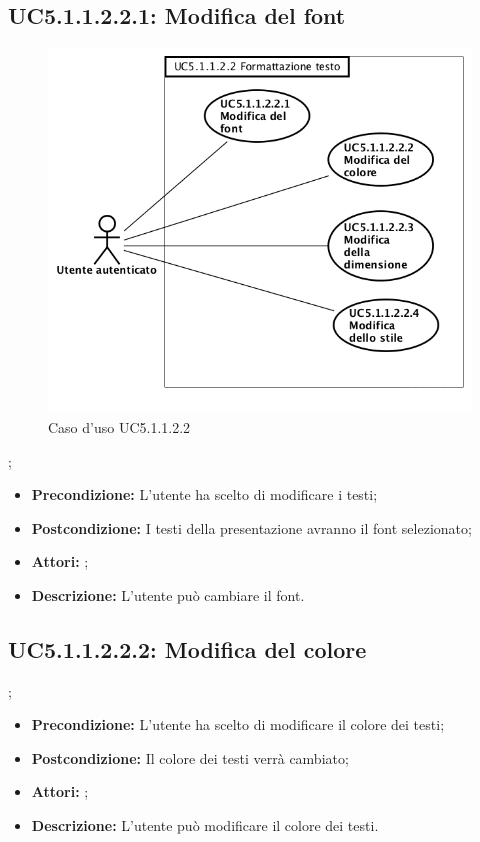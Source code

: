 \subsection{ UC5.1.1.2.2.1: Modifica del font}

\begin{figure}[h]
	\begin{center}
	\includegraphics[scale=0.4]{diagram/UC5-1-1-2-2.png}
	\caption{Caso d'uso UC5.1.1.2.2}
	\end{center}
\end{figure};
\begin{itemize}
	\item \textbf{Precondizione:} L'utente ha scelto di modificare i testi;
	\item \textbf{Postcondizione:} I testi della presentazione avranno il font selezionato;
	\item \textbf{Attori:} ;
	\item \textbf{Descrizione:} L'utente può cambiare il font.
\end{itemize}
\subsection{ UC5.1.1.2.2.2: Modifica del colore}
;
\begin{itemize}
	\item \textbf{Precondizione:} L'utente ha scelto di modificare il colore dei testi;
	\item \textbf{Postcondizione:} Il colore dei testi verrà cambiato;
	\item \textbf{Attori:} ;
	\item \textbf{Descrizione:} L'utente può modificare il colore dei testi.
\end{itemize}
